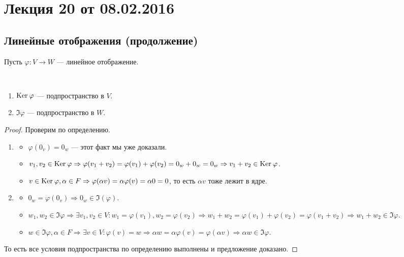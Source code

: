 


\renewcommand{\phi}{\varphi}

\section{Лекция 20 от 08.02.2016}

\subsection{Линейные отображения (продолжение)}
Пусть $\phi\colon V \rightarrow W$ --- линейное отображение.

\begin{Suggestion}
	\ 
	\begin{enumerate}
		\item $\Ker \phi$ --- подпространство в $V$.
		\item $\Im \phi$ --- подпространство в $W$.
		
	\end{enumerate}
\end{Suggestion}

\begin{proof}
    Проверим по определению.
    \begin{enumerate}
        \item \begin{itemize}
            \item $\phi(0_v) = 0_w$ --- этот факт мы уже доказали.
            \item $v_1,v_2 \in \Ker \phi \Rightarrow \phi(v_1+v_2) = \phi(v_1) + \phi(v_2) = 0_w + 0_w = 0_w \Rightarrow v_1+v_2 \in \Ker \phi$.
            \item $v \in \Ker \phi, \alpha \in F \Rightarrow \phi(\alpha v) = \alpha \phi(v) = \alpha 0 = 0$, то есть $\alpha v$ тоже лежит в ядре.
        \end{itemize}
        \item \begin{itemize}
            \item $0_w = \phi(0_v) \Rightarrow 0_w \in \Im(\phi)$.
            \item $w_1,w_2 \in \Im \phi \Rightarrow \exists v_1, v_2 \in V\colon w_1 = \phi(v_1), w_2 = \phi(v_2) \Rightarrow w_1 + w_2 = \phi(v_1) + \phi(v_2) = \phi(v_1 + v_2) \Rightarrow w_1 + w_2 \in \Im \phi$.
            \item $w \in \Im \phi, \alpha \in F \Rightarrow \exists v \in V \colon \phi(v) = w \Rightarrow \alpha w = \alpha \phi(v) = \phi(\alpha v) \Rightarrow \alpha w \in \Im \phi$.
            
        \end{itemize}
    \end{enumerate}
    То есть все условия подпространства по определению выполнены и предложение доказано.
\end{proof}

